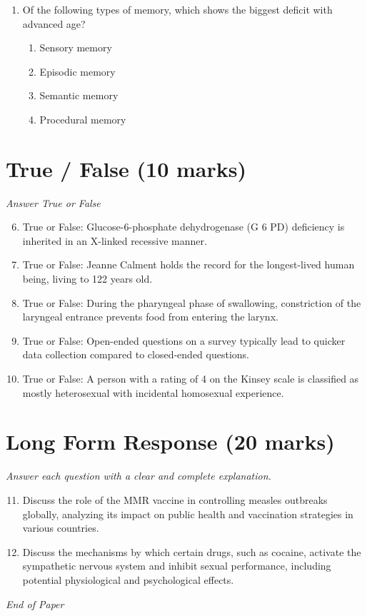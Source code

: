 \documentclass[12pt]{article}
\begin{document}
\begin{enumerate}[label=\arabic*.]
\begin{enumerate}[label=(\alph*)]
    \item provide an equal balance of punishment and reinforcement
    \item are extremely attractive and provide a lot of reinforcement
\end{enumerate}
\item Of the following types of memory, which shows the biggest deficit with advanced age?
\begin{enumerate}[label=(\alph*)]
    \item Sensory memory
    \item Episodic memory
    \item Semantic memory
    \item Procedural memory
\end{enumerate}
\end{enumerate}

\section*{True / False (10 marks)}
\textit{Answer True or False}
\begin{enumerate}[label=\arabic*.]
\setcounter{enumi}{5}
\item True or False: Glucose-6-phosphate dehydrogenase (G 6 PD) deficiency is inherited in an X-linked recessive manner.
\item True or False: Jeanne Calment holds the record for the longest-lived human being, living to 122 years old.
\item True or False: During the pharyngeal phase of swallowing, constriction of the laryngeal entrance prevents food from entering the larynx.
\item True or False: Open-ended questions on a survey typically lead to quicker data collection compared to closed-ended questions.
\item True or False: A person with a rating of 4 on the Kinsey scale is classified as mostly heterosexual with incidental homosexual experience.
\end{enumerate}

\section*{Long Form Response (20 marks)}
\textit{Answer each question with a clear and complete explanation.}
\begin{enumerate}[label=\arabic*.]
\setcounter{enumi}{10}
\item Discuss the role of the MMR vaccine in controlling measles outbreaks globally, analyzing its impact on public health and vaccination strategies in various countries.
\item Discuss the mechanisms by which certain drugs, such as cocaine, activate the sympathetic nervous system and inhibit sexual performance, including potential physiological and psychological effects.
\end{enumerate}

\vfill
\noindent\textit{End of Paper}
\end{document}

